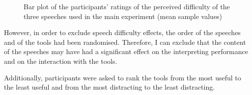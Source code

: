 \begin{figure}
\caption[Perceived difficulty of the speeches used in the experiment]{Bar plot of the participants' ratings of the perceived difficulty of the three speeches used in the main experiment (mean sample values)}
\label{fig:difficultyspeech}
\end{figure}

However, in order to exclude speech difficulty effects, the order of the speeches and of the tools had been randomised. Therefore, I can exclude that the content of the speeches may have had a significant effect on the interpreting performance and on the interaction with the tools.

Additionally, participants were asked to rank the tools from the most useful to the least useful and from the most distracting to the least distracting.

